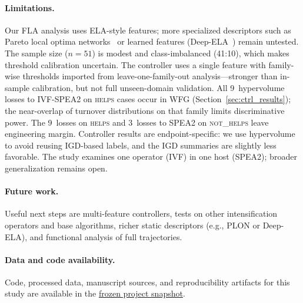 \documentclass[runningheads]{llncs}
\begin{document}
\paragraph{Limitations.}
Our FLA analysis uses ELA-style features; more specialized descriptors such as
Pareto local optima networks~\cite{ochoa2024funnels} or learned features
(Deep-ELA~\cite{seiler2024deep}) remain untested. The sample size
($n\!=\!51$) is modest and class-imbalanced (41:10), which makes threshold
calibration uncertain. The controller uses a single feature with family-wise
thresholds imported from leave-one-family-out analysis---stronger than
in-sample calibration, but not full unseen-domain validation. All
9~hypervolume losses to IVF-SPEA2 on \textsc{helps} cases occur in WFG
(Section~\ref{sec:ctrl_results}); the near-overlap of turnover distributions
on that family limits discriminative power. The 9~losses on \textsc{helps}
and 3~losses to SPEA2 on \textsc{not\_helps} leave engineering margin.
Controller results are endpoint-specific: we use hypervolume to avoid reusing
IGD-based labels, and the IGD summaries are slightly less favorable. The
study examines one operator (IVF) in one host (SPEA2); broader
generalization remains open.

\paragraph{Future work.}
Useful next steps are multi-feature controllers, tests on other
intensification operators and base algorithms, richer static descriptors
(e.g., PLON or Deep-ELA), and functional analysis of full trajectories.

\paragraph{Data and code availability.}
Code, processed data, manuscript sources, and reproducibility artifacts for
this study are available in the
\href{https://github.com/pedsanches/IVF-SPEA2/releases/tag/submission-snapshot-2026-03}{frozen project snapshot}.



\end{document}

